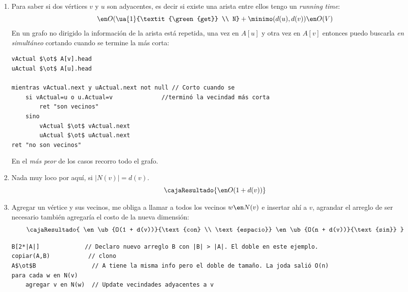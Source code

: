 \begin{enumerate}[label=$\text{\red{ED}}_\arabic*)$, itemsep=-2pt]
\begin{enumerate}[label=$\alph*)$]
                La complejidad espacial:
                $$
                  \cajaResultado{
                    \en O(n + m)
                  }
                $$
                Este último resultado para un grafo con $m\gg n \to O(n^2)$, complejidad espacial como la \textit{matriz de adyacencia}.

          \item Para saber si dos vértices $v$ y $u$ son adyacentes, es decir si existe una arista entre ellos tengo un \textit{running time}:
                $$
                  \en O(\ua{1}{\textit{\green{get}} \\ N} + \minimo(d(u), d(v)) \en O(V)
                $$
                En un grafo no dirigido la información de la arista está repetida, una vez en $A[u]$ y otra vez en $A[v]$
                entonces puedo buscarla \textit{en simultáneo} cortando cuando se termine la más corta:
                \begin{tcolorbox}
                  \begin{lstlisting}
vActual $\ot$ A[v].head
uActual $\ot$ A[u].head

mientras vActual.next y uActual.next not null // Corto cuando se
    si vActual=u o u.Actual=v              //terminó la vecindad más corta
        ret "son vecinos"
    sino 
        vActual $\ot$ vActual.next 
        uActual $\ot$ uActual.next 
ret "no son vecinos" \end{lstlisting}
                \end{tcolorbox}
                En el \textit{más peor} de los casos recorro todo el grafo.

          \item\label{ej-14:item-1-c}
                Nada muy loco por aquí, si $|N(v)| = d(v)$.
                $$
                  \cajaResultado{
                    \en O(1 + d(v))
                  }
                $$

          \item Agregar un vértice y sus vecinos, me obliga a llamar a todos los vecinos $w \en N(v)$ e insertar ahí a $v$, agrandar
                el arreglo de ser necesario también agregaría el costo de la nueva dimensión:
                $$
                  \cajaResultado{
                    \en \ub{O(1 + d(v))}{\text{con} \\ \text{espacio}} \en \ub{O(n + d(v))}{\text{sin}}
                  }
                $$
                \begin{tcolorbox}
                  \begin{lstlisting}
B[2*|A|]             // Declaro nuevo arreglo B con |B| > |A|. El doble en este ejemplo.
copiar(A,B)           // clono
A$\ot$B                // A tiene la misma info pero el doble de tamaño. La joda salió O(n)
para cada w en N(v) 
    agregar v en N(w)  // Update vecindades adyacentes a v \end{lstlisting}
                \end{tcolorbox}


\end{enumerate}
\end{enumerate}
